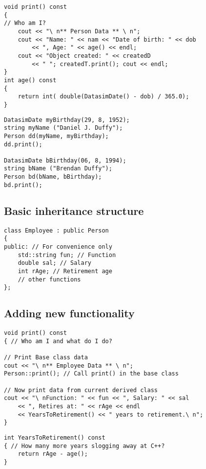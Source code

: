 \begin{lstlisting}
void print() const
{
// Who am I?
	cout << "\ n** Person Data ** \ n";
	cout << "Name: " << nam << "Date of birth: " << dob
		<< ", Age: " << age() << endl;
	cout << "Object created: " << createdD
		<< " "; createdT.print(); cout << endl;
}
int age() const
{
	return int( double(DatasimDate() - dob) / 365.0);
}
\end{lstlisting}

\begin{lstlisting}
DatasimDate myBirthday(29, 8, 1952);
string myName ("Daniel J. Duffy");
Person dd(myName, myBirthday);
dd.print();

DatasimDate bBirthday(06, 8, 1994);
string bName ("Brendan Duffy");
Person bd(bName, bBirthday);
bd.print();
\end{lstlisting}

\subsection{Basic inheritance structure}




\begin{lstlisting}
class Employee : public Person
{
public: // For convenience only
	std::string fun; // Function
	double sal; // Salary
	int rAge; // Retirement age
	// other functions
};
\end{lstlisting}

\subsection{Adding new functionality}

\begin{lstlisting}
void print() const
{ // Who am I and what do I do?

// Print Base class data
cout << "\ n** Employee Data ** \ n";
Person::print(); // Call print() in the base class

// Now print data from current derived class
cout << "\ nFunction: " << fun << ", Salary: " << sal
	<< ", Retires at: " << rAge << endl
	<< YearsToRetirement() << " years to retirement.\ n";
}
\end{lstlisting}

\begin{lstlisting}
int YearsToRetirement() const
{ // How many more years slogging away at C++?
	return rAge - age();
}
\end{lstlisting}

